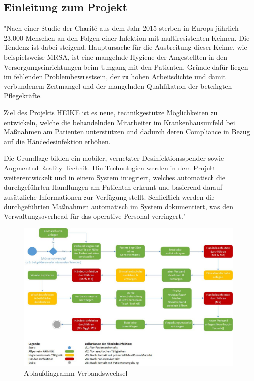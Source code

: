 \newpage
\subsection{Einleitung zum Projekt}
\label{sec:Porjekt}

"Nach einer Studie der Charité aus dem Jahr 2015 sterben in Europa jährlich 23.000 Menschen an den Folgen einer Infektion mit multiresistenten Keimen. Die Tendenz ist dabei steigend. Hauptursache für die Ausbreitung dieser Keime, wie beispielsweise MRSA, ist eine mangelnde Hygiene der Angestellten in den Versorgungseinrichtungen beim Umgang mit den Patienten. Gründe dafür liegen im fehlenden Problembewusstsein, der zu hohen Arbeitsdichte und damit verbundenem Zeitmangel und der mangelnden Qualifikation der beteiligten Pflegekräfte.\par
Ziel des Projekts HEIKE ist es neue, technikgestütze Möglichkeiten zu entwickeln, welche die behandelnden Mitarbeiter im Krankenhausumfeld bei Maßnahmen am Patienten unterstützen und dadurch deren Compliance in Bezug auf die Händedesinfektion erhöhen. \par
Die Grundlage bilden ein mobiler, vernetzter Desinfektionsspender sowie Augmented-Reality-Technik. Die Technologien werden in dem Projekt weiterentwickelt und in einem System integriert, welches automatisch die durchgeführten Handlungen am Patienten erkennt und basierend darauf zusätzliche Informationen zur Verfügung stellt. Schließlich werden die durchgeführten Maßnahmen automatisch im System dokumentiert, was den Verwaltungsoverhead für das operative Personal verringert." \cite{FZI_Projekt}
\begin{figure}[htb]
  \centering  
  \includegraphics[scale=0.45]{img/Ablaufdiagramm_Verbandswechsel.jpg}
  \caption{Ablaufdiagramm Verbandswechsel \cite{AblauffdiagrammVerbandswechsel}}
  \label{fig:Ablaufdiagramm Verbandswechsel}
\end{figure}


